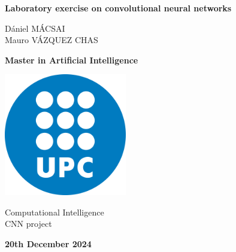 \documentclass[11pt]{article}
\begin{document}
\begin{titlepage}
    \centering
    \vspace*{2cm}
    
    
    {\Huge\bfseries Laboratory exercise on convolutional neural networks\par}
    \vspace{1cm}
    
    \vspace{2cm}
    
    {\large
    Dániel MÁCSAI \\ 
    Mauro VÁZQUEZ CHAS
    \par}
    
    \vspace{2cm}
    
    {\large
    \textbf{Master in Artificial Intelligence}
    \par}
    
    \includegraphics[width=0.4\textwidth]{Logo_UPC.png}\par\vspace{1cm}

    \vspace{1cm}

    {\large
    Computational Intelligence\\
    CNN project
    \par}
    
    \vspace{1cm}
    
    {\large\bfseries 20th December 2024\par}
    
\end{titlepage}


\newpage

\tableofcontents
\newpage

\end{document}
